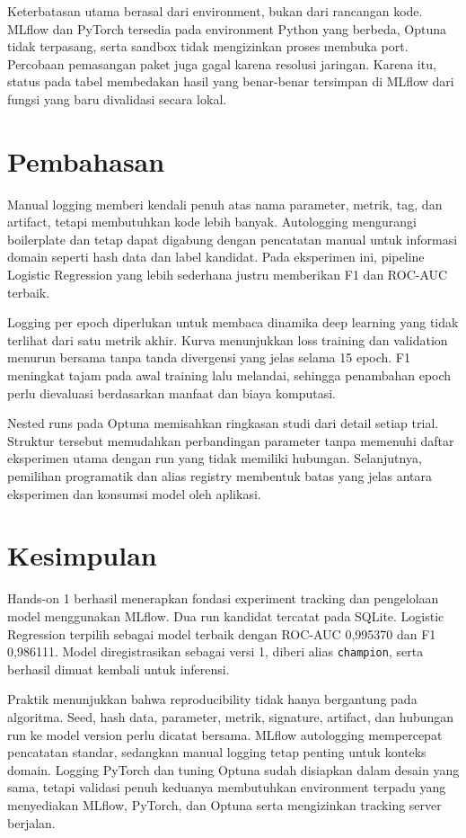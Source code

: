 \documentclass[11pt,a4paper]{article}
\begin{document}
Keterbatasan utama berasal dari environment, bukan dari rancangan kode. MLflow dan PyTorch tersedia pada environment Python yang berbeda, Optuna tidak terpasang, serta sandbox tidak mengizinkan proses membuka port. Percobaan pemasangan paket juga gagal karena resolusi jaringan. Karena itu, status pada tabel membedakan hasil yang benar-benar tersimpan di MLflow dari fungsi yang baru divalidasi secara lokal.

\section{Pembahasan}

Manual logging memberi kendali penuh atas nama parameter, metrik, tag, dan artifact, tetapi membutuhkan kode lebih banyak. Autologging mengurangi boilerplate dan tetap dapat digabung dengan pencatatan manual untuk informasi domain seperti hash data dan label kandidat. Pada eksperimen ini, pipeline Logistic Regression yang lebih sederhana justru memberikan F1 dan ROC-AUC terbaik.

Logging per epoch diperlukan untuk membaca dinamika deep learning yang tidak terlihat dari satu metrik akhir. Kurva menunjukkan loss training dan validation menurun bersama tanpa tanda divergensi yang jelas selama 15 epoch. F1 meningkat tajam pada awal training lalu melandai, sehingga penambahan epoch perlu dievaluasi berdasarkan manfaat dan biaya komputasi.

Nested runs pada Optuna memisahkan ringkasan studi dari detail setiap trial. Struktur tersebut memudahkan perbandingan parameter tanpa memenuhi daftar eksperimen utama dengan run yang tidak memiliki hubungan. Selanjutnya, pemilihan programatik dan alias registry membentuk batas yang jelas antara eksperimen dan konsumsi model oleh aplikasi.

\section{Kesimpulan}

Hands-on 1 berhasil menerapkan fondasi experiment tracking dan pengelolaan model menggunakan MLflow. Dua run kandidat tercatat pada SQLite. Logistic Regression terpilih sebagai model terbaik dengan ROC-AUC 0,995370 dan F1 0,986111. Model diregistrasikan sebagai  versi 1, diberi alias \texttt{champion}, serta berhasil dimuat kembali untuk inferensi.

Praktik menunjukkan bahwa reproducibility tidak hanya bergantung pada algoritma. Seed, hash data, parameter, metrik, signature, artifact, dan hubungan run ke model version perlu dicatat bersama. MLflow autologging mempercepat pencatatan standar, sedangkan manual logging tetap penting untuk konteks domain. Logging PyTorch dan tuning Optuna sudah disiapkan dalam desain yang sama, tetapi validasi penuh keduanya membutuhkan environment terpadu yang menyediakan MLflow, PyTorch, dan Optuna serta mengizinkan tracking server berjalan.
\end{document}

